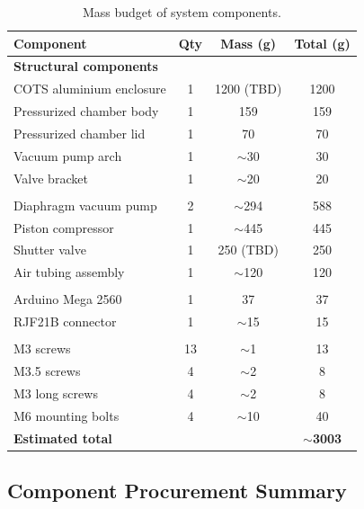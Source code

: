 \begin{table}[htbp]
\centering
\begin{tabular}{lccc}
\toprule
\textbf{Component} & \textbf{Qty} & \textbf{Mass (g)} & \textbf{Total (g)} \\
\midrule

\multicolumn{4}{l}{\textbf{Structural components}} \\

COTS aluminium enclosure & 1 & 1200 (TBD) & 1200 \\
Pressurized chamber body & 1 & 159 & 159 \\
Pressurized chamber lid & 1 & 70 & 70 \\
Vacuum pump arch & 1 & $\sim$30 & 30 \\
Valve bracket & 1 & $\sim$20 & 20 \\

\addlinespace
\multicolumn{4}{l}{\textbf{Fluid system}} \\

Diaphragm vacuum pump & 2 & $\sim$294 & 588 \\
Piston compressor & 1 & $\sim$445 & 445 \\
Shutter valve & 1 & 250 (TBD) & 250 \\
Air tubing assembly & 1 & $\sim$120 & 120 \\

\addlinespace
\multicolumn{4}{l}{\textbf{Electronics}} \\

Arduino Mega 2560 & 1 & 37 & 37 \\
RJF21B connector & 1 & $\sim$15 & 15 \\

\addlinespace
\multicolumn{4}{l}{\textbf{Fasteners}} \\

M3 screws & 13 & $\sim$1 & 13 \\
M3.5 screws & 4 & $\sim$2 & 8 \\
M3 long screws & 4 & $\sim$2 & 8 \\
M6 mounting bolts & 4 & $\sim$10 & 40 \\

\midrule
\textbf{Estimated total} & & & \textbf{$\sim$3003} \\
\bottomrule
\end{tabular}
\caption{Mass budget of system components.}
\label{tab:mass_budget}
\end{table}

\subsection{Component Procurement Summary}

